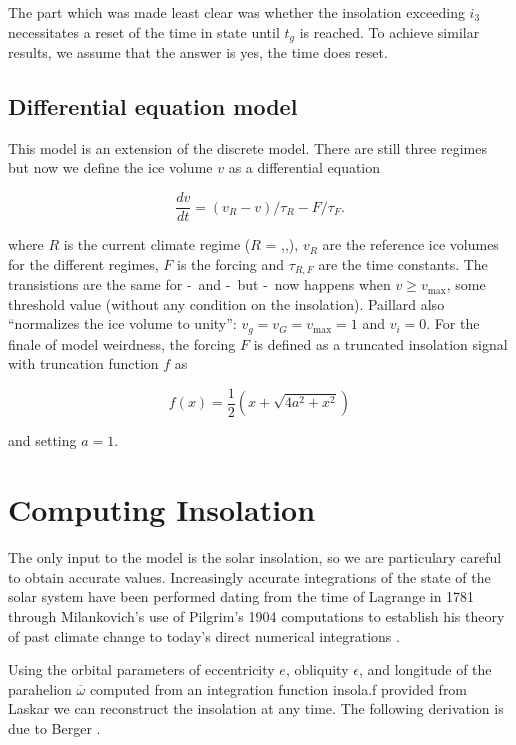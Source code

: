The part which was made least clear was whether the insolation exceeding $i_3$ necessitates a reset of the time in state \mild until $t_g$ is reached.
To achieve similar results, we assume that the answer is yes, the time does reset.



\subsection{Differential equation model}

This model is an extension of the discrete model.
There are still three regimes but now we define the ice volume $v$ as a differential equation

$$ \frac{dv}{dt} = (v_R - v) /\tau _R - F/\tau _F .$$

where $R$ is the current climate regime ($R$ = \inter,\mild,\full), $v_R$ are the reference ice volumes for the different regimes, $F$ is the forcing and $\tau _{R,F}$ are the time constants.
The transistions are the same for \inter-\mild~and \full-\mild~but \mild-\full~now happens when $v \geq v_\text{max}$, some threshold value (without any condition on the insolation).
Paillard also ``normalizes the ice volume to unity'': $v_g = v_G = v_\text{max} = 1$ and $v_i = 0$.
For the finale of model weirdness, the forcing $F$ is defined as a truncated insolation signal with truncation function $f$ as

$$ f(x) = \frac{1}{2} \left ( x + \sqrt{4a^2 + x^2} \right ) $$

and setting $a=1$.

\section{Computing Insolation}

The only input to the model is the solar insolation, so we are particulary careful to obtain accurate values.
Increasingly accurate integrations of the state of the solar system have been performed dating from the time of Lagrange in 1781 through Milankovich's use of Pilgrim's 1904 computations to establish his theory of past climate change to today's direct numerical integrations \cite{laskar2004long}.

Using the orbital parameters of eccentricity $e$, obliquity $\epsilon$, and longitude of the parahelion $\overline{\omega}$ computed from an integration function insola.f provided from Laskar \cite{laskar2004long} we can reconstruct the insolation at any time.
The following derivation is due to Berger \cite{berger1981long}.

